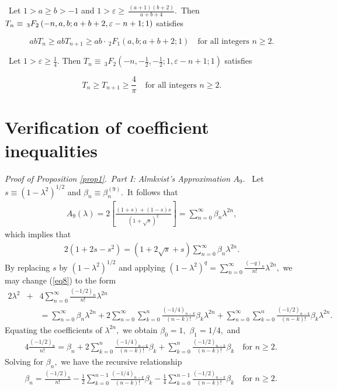 \documentclass[final,oneeqnum]{siamltex}
\begin{document}
\begin{corollary}
\label{cor1}%
\ Let  $1>a\geq b>-1$ and
$1>\varepsilon\geq\,\frac{(a+1)(b+2)}{a+b+4}$.\ Then
$\displaystyle T_{n}\equiv \\ \,_{3}F_{2}\left(-n,a,b;a+b+2,\varepsilon
-n+1;1\right)$ satisfies
\end{corollary}
\[
a b T_{n} \geq a b T_{n+1} \geq a b\cdot\,_{2}F_{1}\left(a,b;a+b+2;1\right)
\quad \mbox{for all integers $n
\geq 2$.} 
\]
\begin{corollary}
\label{cor2}%
\  Let  $1>\varepsilon\geq\frac{1}{4}$.
Then $
T_{n}\equiv\,_{3}F_{2}\left(-n,-\frac{1}{2},-\frac{1}{2};1,\varepsilon
-n+1;1\right)$ satisfies
\end{corollary}
\[
T_{n} \geq T_{n+1}\geq
\frac{4}{\pi} \quad \mbox{for all integers $n
\geq 2$.} 
\]

\section{Verification of coefficient inequalities} 
\mbox{}

{\it Proof of Proposition {\rm\ref{prop1}}}.\ {\em Part {\rm I:} Almkvist's
Approximation $A_{9}$.} \
Let $s\equiv   (1-\lambda^2)^{1/2}$ and
$\beta_{n}\equiv   \beta^{(9)}_{n}$.\  It follows  that
\begin{eqnarray}
 A_{9}(\lambda) = 2\left[\frac{(1+s) +(1-s)s}{(1+\sqrt{s})^2}\right] =
 \sum_{n=0}^{\infty}\beta_{n}\lambda^{2n},  \nonumber
\end{eqnarray} 
which implies that
\begin{eqnarray}
 2(1+2s-s^2) = (1 + 2\sqrt{s} +
s)\sum_{n=0}^{\infty}\beta_{n}\lambda^{2n}.
\label{eq8}
\end{eqnarray} 
By replacing $s$  by $(1-\lambda^2)^{1/2}$ and applying
$ (1-\lambda^2)^{q} = \sum_{n=0}^{\infty}\frac{(-q)_{n}}{n!}\lambda^{2n}, $
we may change (\ref{eq8}) to the form
\begin{eqnarray} 
2\lambda^2 &+&
4\sum_{n=0}^{\infty}\frac{(-1/2)_{n}}{n!}\lambda^{2n} \nonumber \\
&&=\sum_{n=0}^{\infty}\beta_{n}\lambda^{2n}+
2\sum_{n=0}^{\infty}\sum_{k=0}^{n}\frac{(-1/4)_{n-k}}{(n-k)!}\beta_{k}\lambda^{2
n}+
\sum_{n=0}^{\infty}\sum_{k=0}^{n}\frac{(-1/2)_{n-k}}{(n-k)!}\beta_{k}\lambda
^{2n}.\  \nonumber
\end{eqnarray} 
Equating the coefficients of $\lambda^{2n},$ we obtain
 $\beta_{0}=1,$ $\beta_{1}=1/4,$ and
\begin{eqnarray} 
4\frac{(-1/2)_{n}}{n!}= \beta_{n} +
2\sum_{k=0}^{n}\frac{(-1/4)_{n-k}}{(n-k)!}\beta_{k}
+\sum_{k=0}^{n}\frac{(-1/2)_{n-k}}{(n-k)!}\beta_{k}\quad
\mbox{for $n\geq 2$}.\ \nonumber
\end{eqnarray} 
Solving for $\beta_{n},$ we have the recursive relationship
\begin{eqnarray}
\beta_{n} = \frac{(-1/2)_{n}}{n!} -
\frac{1}{2}\sum_{k=0}^{n-1}\frac{(-1/4)_{n-k}}{(n-k)!}\beta_{k}-
\frac{1}{4}\sum_{k=0}^{n-1}\frac{(-1/2)_{n-k}}{(n-k)!}\beta_{k} \quad
\mbox{for $n\geq 2$}.\ 
\label{eq9}
\end{eqnarray}
\end{document}
